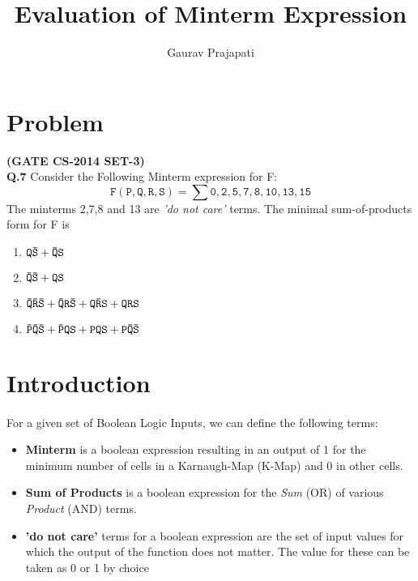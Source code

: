 \documentclass[a4paper,11pt]{article}
\title{\textbf{Evaluation of Minterm Expression}}
\author{Gaurav Prajapati}
\newcommand{\mathfsc}[2]{#1#2\normalsize}
\begin{document}
\date{}
\maketitle

\tableofcontents

\newpage
\section{Problem}
\label{sec:ques}
\textbf{(GATE CS-2014 SET-3)}\\
\textbf{Q.7} Consider the Following Minterm expression for F:
    \mathfsc{\large}{\[\mathtt{F (P,Q,R,S) = \sum 0,2,5,7,8,10,13,15}\]}
The minterms 2,7,8 and 13 are \textit{'do not care'} terms. The minimal sum-of-products form for F is
\begin{enumerate}[label=(\Alph*)]
    \item \mathfsc{\large}{\(\mathtt{Q\Bar{S} + \Bar{Q}S}\)}
    \item \mathfsc{\large}{\(\mathtt{\Bar{Q}\Bar{S} + QS}\)}
    \item \mathfsc{\large}{\(\mathtt{\Bar{Q}\Bar{R}\Bar{S} + \Bar{Q}R\Bar{S} + Q\Bar{R}S + QRS}\)}
    \item \mathfsc{\large}{\(\mathtt{\Bar{P}\Bar{Q}\Bar{S} + \Bar{P}QS + PQS + P\Bar{Q}\Bar{S}}\)}
\end{enumerate}
\bigskip

\section{Introduction}
\paragraph{}
For a given set of Boolean Logic Inputs, we can define the following terms:
\begin{itemize}
    \item \textbf{Minterm} is a boolean expression resulting in an output of 1 for the minimum number of cells in a Karnaugh-Map (K-Map) and 0 in other cells.
    \item \textbf{Sum of Products} is a boolean expression for the \textit{Sum} (OR) of various \textit{Product} (AND) terms.
    \item \textbf{'do not care'} terms for a boolean expression are the set of input values for which the output of the function does not matter. The value for these can be taken as 0 or 1 by choice
\end{itemize}
\bigskip
\end{document}
